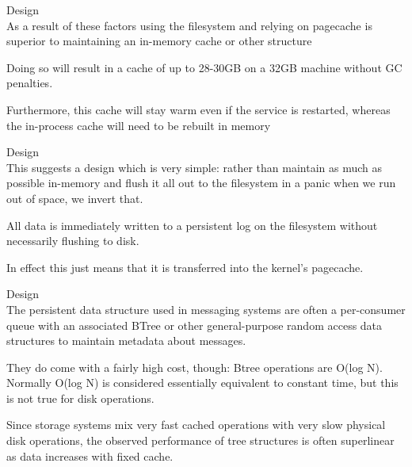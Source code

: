 \begin{frame}[plain,t]{Design} %
     \\
    \vspace{2ex}
    As a result of these factors using the filesystem and relying on pagecache is superior to maintaining an in-memory cache or other structure
    
    \vspace{2ex}
    Doing so will result in a cache of up to 28-30GB on a 32GB machine without GC penalties.
    
    \vspace{2ex}
    Furthermore, this cache will stay warm even if the service is restarted, whereas the in-process cache will need to be rebuilt in memory
    
    
    
\end{frame}
\begin{frame}[plain,t]{Design} %
     \\
    \vspace{2ex}
    This suggests a design which is very simple: rather than maintain as much as possible in-memory and flush it all out to the filesystem in a panic when we run out of space, we invert that. 
    
     \vspace{2ex}
    All data is immediately written to a persistent log on the filesystem without necessarily flushing to disk.
    
     \vspace{2ex}
     In effect this just means that it is transferred into the kernel's pagecache.
    
    
\end{frame}
\begin{frame}[plain,t]{Design} %
     \\
    \vspace{2ex}
    The persistent data structure used in messaging systems are often a per-consumer queue with an associated BTree or other general-purpose random access data structures to maintain metadata about messages.
    
    \vspace{2ex}
    They do come with a fairly high cost, though: Btree operations are O(log N). Normally O(log N) is considered essentially equivalent to constant time, but this is not true for disk operations. 
    
    \vspace{2ex}
    Since storage systems mix very fast cached operations with very slow physical disk operations, the observed performance of tree structures is often superlinear as data increases with fixed cache.
    
    
    
\end{frame}
